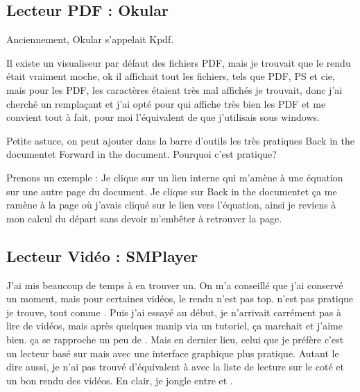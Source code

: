 \documentclass[a4paper,twoside]{article}
\begin{document}
\subsection{Lecteur PDF : Okular}
\begin{remarque}
Anciennement, Okular s'appelait Kpdf.
\end{remarque}

Il existe un visualiseur par défaut des fichiers PDF, mais je trouvait que le rendu était vraiment moche, ok il affichait tout les fichiers, tels que PDF, PS et cie, mais pour les PDF, les caractères étaient très mal affichés je trouvait, donc j'ai cherché un remplaçant et j'ai opté pour  qui affiche très bien les PDF et me convient tout à fait, pour moi l'équivalent de  que j'utilisais sous windows.

\bigskip

Petite astuce, on peut ajouter dans la barre d'outils les très pratiques \og Back in the document\fg et \og Forward in the document\fg. Pourquoi c'est pratique?

Prenons un exemple : Je clique sur un lien interne qui m'amène à une équation sur une autre page du document. Je clique sur \og Back in the document\fg et ça me ramène à la page où j'avais cliqué sur le lien vers l'équation, ainsi je reviens à mon calcul du départ sans devoir m'embêter à retrouver la page.

\subsection{Lecteur Vidéo : SMPlayer}
J'ai mis beaucoup de temps à en trouver un. On m'a conseillé  que j'ai conservé un moment, mais pour certaines vidéos, le rendu n'est pas top.  n'est pas pratique je trouve, tout comme . Puis j'ai essayé  au début, je n'arrivait carrément pas à lire de vidéos, mais après quelques manip via un tutoriel, ça marchait et j'aime bien. ça se rapproche un peu de . Mais en dernier lieu, celui que je préfère c'est  un lecteur basé sur  mais avec une interface graphique plus pratique. Autant le dire aussi, je n'ai pas trouvé d'équivalent à  avec la liste de lecture sur le coté et un bon rendu des vidéos. En clair, je jongle entre  et .
\end{document}
